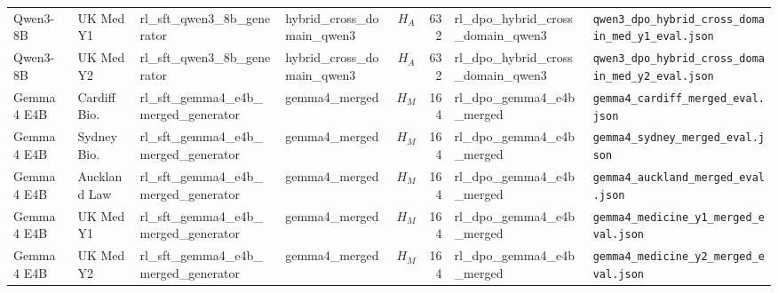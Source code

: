 \begin{table}[h]
{\begin{tabular}{llllcrll}
Qwen3-8B & UK Med Y1 & rl\_sft\_qwen3\_8b\_generator & hybrid\_cross\_domain\_qwen3 & $H_A$ & 632 & rl\_dpo\_hybrid\_cross\_domain\_qwen3 & \texttt{qwen3\_dpo\_hybrid\_cross\_domain\_med\_y1\_eval.json} \\
Qwen3-8B & UK Med Y2 & rl\_sft\_qwen3\_8b\_generator & hybrid\_cross\_domain\_qwen3 & $H_A$ & 632 & rl\_dpo\_hybrid\_cross\_domain\_qwen3 & \texttt{qwen3\_dpo\_hybrid\_cross\_domain\_med\_y2\_eval.json} \\
Gemma~4 E4B & Cardiff Bio. & rl\_sft\_gemma4\_e4b\_merged\_generator & gemma4\_merged & $H_M$ & 164 & rl\_dpo\_gemma4\_e4b\_merged & \texttt{gemma4\_cardiff\_merged\_eval.json} \\
Gemma~4 E4B & Sydney Bio. & rl\_sft\_gemma4\_e4b\_merged\_generator & gemma4\_merged & $H_M$ & 164 & rl\_dpo\_gemma4\_e4b\_merged & \texttt{gemma4\_sydney\_merged\_eval.json} \\
Gemma~4 E4B & Auckland Law & rl\_sft\_gemma4\_e4b\_merged\_generator & gemma4\_merged & $H_M$ & 164 & rl\_dpo\_gemma4\_e4b\_merged & \texttt{gemma4\_auckland\_merged\_eval.json} \\
Gemma~4 E4B & UK Med Y1 & rl\_sft\_gemma4\_e4b\_merged\_generator & gemma4\_merged & $H_M$ & 164 & rl\_dpo\_gemma4\_e4b\_merged & \texttt{gemma4\_medicine\_y1\_merged\_eval.json} \\
Gemma~4 E4B & UK Med Y2 & rl\_sft\_gemma4\_e4b\_merged\_generator & gemma4\_merged & $H_M$ & 164 & rl\_dpo\_gemma4\_e4b\_merged & \texttt{gemma4\_medicine\_y2\_merged\_eval.json} \\
\bottomrule
\end{tabular}}
\end{table}
